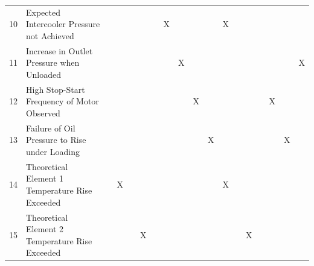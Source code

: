 \begin{table}[htbp]
\begin{tabular}{r|l|r|r|r|r|r|r|r|r|r|r|r|r|r|r|r|r}
    10    & Expected Intercooler Pressure not Achieved &       &       &       &       &       & X     &       &       &       & X     &       &       &       &       &       &  \\
    11    & Increase in Outlet Pressure when Unloaded &       &       &       &       &       &       & X     &       &       &       &       &       &       &       &       & X \\
    12    & High Stop-Start Frequency of Motor Observed &       &       &       &       &       &       &       & X     &       &       &       &       &       & X     &       &  \\
    13    & Failure of Oil Pressure to Rise under Loading &       &       &       &       &       &       &       &       & X     &       &       &       &       &       & X     &  \\
    14    & Theoretical Element 1 Temperature Rise Exceeded &       & X     &       &       &       &       &       &       &       & X     &       &       &       &       &       &  \\
    15    & Theoretical Element 2 Temperature Rise Exceeded &       &       &       & X     &       &       &       &       &       &       &       & X     &       &       &       &  \\
    \bottomrule
    \end{tabular}%
  \label{tab:ruleset}%
\end{table}%

